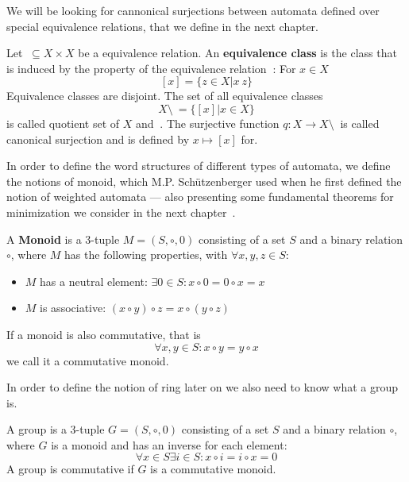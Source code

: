             We will be looking for cannonical surjections between automata defined over special equivalence relations, that we define in the next chapter.
            \begin{definition}
            Let $~ \subseteq X \times X$ be a equivalence relation. An \textbf{equivalence class} is the class that is induced by the property of the equivalence relation $~$: For $x \in X$
            \[ [x] = \{ z \in X | x ~ z\} \]
            Equivalence classes are disjoint. The set of all equivalence classes 
            \[ X \setminus ~ = \{ [x] | x \in X \} \]
            is called quotient set of $X$ and $~$. The surjective function $q: X \rightarrow X \setminus ~$ is called canonical surjection and is defined by $x \mapsto [x]$ for.
            \end{definition}
                        
            In order to define the word structures of different types of automata, we define the notions of monoid, which M.P. Schützenberger used when he first defined the notion of weighted automata --- also presenting some fundamental theorems for minimization we consider in the next chapter~\autocite{schutz}.            
            \begin{definition}[Monoid]
            A \textbf{Monoid} is a 3-tuple $M = (S, \circ, 0)$ consisting of a set $S$ and a binary relation $\circ$, where $M$ has the following properties, with $\forall x, y, z \in S$:
            \begin{itemize}
            \item $M$ has a neutral element: $\exists 0 \in S: x \circ 0 = 0 \circ x = x $
             \item $M$ is associative: $(x \circ y) \circ z = x \circ (y \circ z)$ 
            \end{itemize}
            If a monoid is also commutative, that is 
            \[ \forall x,y \in S: x \circ y = y \circ x \]
            we call it a commutative monoid.
            \end{definition}
            
            
            In order to define the notion of ring later on we also need to know what a group is.
            \begin{definition}[Group]
            A group is a 3-tuple $G = (S, \circ, 0)$ consisting of a set $S$ and a binary relation $\circ$, where $G$ is a monoid and has an inverse for each element:
            \[ \forall x \in S \exists i \in S: x \circ i = i \circ x = 0 \]
            A group is commutative if $G$ is a commutative monoid.
            \end{definition}
            
